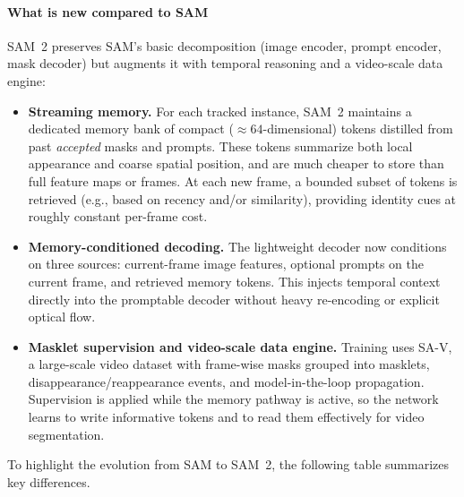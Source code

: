 \begin{enrichment}
\begin{enrichment}
		\paragraph{What is new compared to SAM}
		SAM~2 preserves SAM’s basic decomposition (image encoder, prompt encoder, mask decoder) but augments it with temporal reasoning and a video-scale data engine:
		\begin{itemize}
			\item \textbf{Streaming memory.} For each tracked instance, SAM~2 maintains a dedicated memory bank of compact (\(\approx 64\)-dimensional) tokens distilled from past \emph{accepted} masks and prompts. These tokens summarize both local appearance and coarse spatial position, and are much cheaper to store than full feature maps or frames. At each new frame, a bounded subset of tokens is retrieved (e.g., based on recency and/or similarity), providing identity cues at roughly constant per-frame cost.
			\item \textbf{Memory-conditioned decoding.} The lightweight decoder now conditions on three sources: current-frame image features, optional prompts on the current frame, and retrieved memory tokens. This injects temporal context directly into the promptable decoder without heavy re-encoding or explicit optical flow.
			\item \textbf{Masklet supervision and video-scale data engine.} Training uses SA-V, a large-scale video dataset with frame-wise masks grouped into masklets, disappearance/reappearance events, and model-in-the-loop propagation. Supervision is applied while the memory pathway is active, so the network learns to write informative tokens and to read them effectively for video segmentation.
		\end{itemize}
		
		To highlight the evolution from SAM to SAM~2, the following table summarizes key differences.
		

\end{enrichment}
\end{enrichment}
